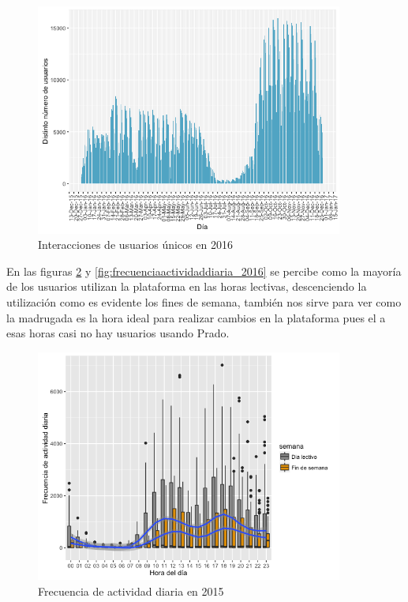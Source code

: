 \begin{figure}[H]
\centering
\includegraphics[width=0.9\textwidth]{../r/distintonumerousuarios_2016}
\caption{Interacciones de usuarios únicos en 2016}
\label{fig:distintonumerousuarios_2016}
\end{figure}


En las figuras \ref{fig:frecuenciaactividaddiaria_2015} y \ref{fig:frecuenciaactividaddiaria_2016} se percibe como la mayoría de los usuarios utilizan la plataforma en las horas lectivas, descenciendo la utilización como es evidente los fines de semana, también nos sirve para ver como la madrugada es la hora ideal para realizar cambios en la plataforma pues el a esas horas casi no hay usuarios usando Prado.

\begin{figure}[H]
\centering
\includegraphics[width=0.9\textwidth]{../r/frecuenciaactividaddiaria_2015}
\caption{Frecuencia de actividad diaria en 2015}
\label{fig:frecuenciaactividaddiaria_2015}
\end{figure}

